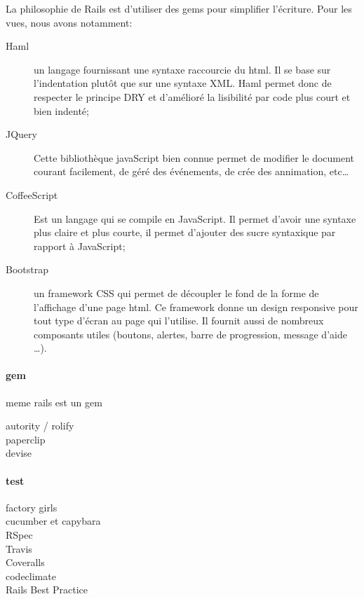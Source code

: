 La philosophie de Rails est d'utiliser des gems pour simplifier l'écriture. Pour les vues, nous avons notamment:
\begin{description}
  \item[Haml] un langage fournissant une syntaxe raccourcie du html. Il se base sur l'indentation plutôt que sur une syntaxe XML. Haml permet donc de respecter le principe DRY et d'amélioré la lisibilité par code plus court et bien indenté;
  \item[JQuery] Cette bibliothèque javaScript bien connue permet de modifier le document courant facilement, de géré des événements, de crée des annimation, etc\ldots
  \item[CoffeeScript] Est un langage qui se compile en JavaScript. Il permet d'avoir une syntaxe plus claire et plus courte, il permet d'ajouter des sucre syntaxique par rapport à JavaScript;
  \item[Bootstrap] un framework CSS qui permet de découpler le fond de la forme de l'affichage d'une page html. Ce framework donne un design responsive pour tout type d'écran au page qui l'utilise. Il fournit aussi de nombreux composants utiles (boutons, alertes, barre de progression, message d'aide \ldots).
\end{description}

\paragraph{gem}
meme rails est un gem

\begin{description}
  \item[autority / rolify]
  \item[paperclip]
  \item[devise]
\end{description}

\paragraph{test}
\begin{description}
  \item[factory girls]
  \item[cucumber et capybara]
  \item[RSpec]
  \item[Travis]
  \item[Coveralls]
  \item[codeclimate]
  \item[Rails Best Practice] 
\end{description}
